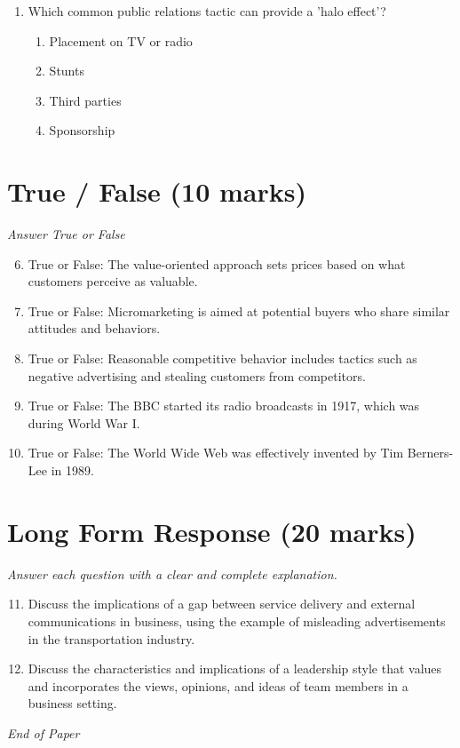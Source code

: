 \documentclass[12pt]{article}
\begin{document}
\begin{enumerate}[label=\arabic*.]
\begin{enumerate}[label=(\alph*)]
    \item Cost leadership.
    \item Differentiation.
    \item Focus strategy.
    \item Market follower strategy.
\end{enumerate}
\item Which common public relations tactic can provide a 'halo effect'?
\begin{enumerate}[label=(\alph*)]
    \item Placement on TV or radio
    \item Stunts
    \item Third parties
    \item Sponsorship
\end{enumerate}
\end{enumerate}

\section*{True / False (10 marks)}
\textit{Answer True or False}
\begin{enumerate}[label=\arabic*.]
\setcounter{enumi}{5}
\item True or False: The value-oriented approach sets prices based on what customers perceive as valuable.
\item True or False: Micromarketing is aimed at potential buyers who share similar attitudes and behaviors.
\item True or False: Reasonable competitive behavior includes tactics such as negative advertising and stealing customers from competitors.
\item True or False: The BBC started its radio broadcasts in 1917, which was during World War I.
\item True or False: The World Wide Web was effectively invented by Tim Berners-Lee in 1989.
\end{enumerate}

\section*{Long Form Response (20 marks)}
\textit{Answer each question with a clear and complete explanation.}
\begin{enumerate}[label=\arabic*.]
\setcounter{enumi}{10}
\item Discuss the implications of a gap between service delivery and external communications in business, using the example of misleading advertisements in the transportation industry.
\item Discuss the characteristics and implications of a leadership style that values and incorporates the views, opinions, and ideas of team members in a business setting.
\end{enumerate}

\vfill
\noindent\textit{End of Paper}
\end{document}
